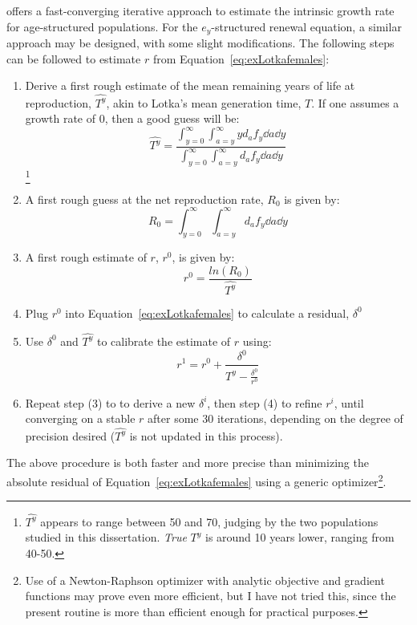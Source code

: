  \FloatBarrier
\label{sec:exrenewalit}
\citet{coale1957new} offers a fast-converging iterative approach to estimate the
intrinsic growth rate for age-structured populations. For the $e_y$-structured
renewal equation, a similar approach may be designed, with some slight
modifications. The following steps can be followed to estimate $r$ from
Equation~\ref{eq:exLotkafemales}:

\begin{enumerate}
  \item Derive a first rough estimate of the mean remaining years of life at
  reproduction, $\widehat{T^y}$, akin to Lotka's mean generation time, $T$. If
  one assumes a growth rate of $0$, then a good guess will be:
\begin{equation}
\widehat{T^y} = \frac{\int _{y=0}^\infty \int _{a=y}^\infty y d_a f_y \dd a
\dd y}{\int _{y=0}^\infty \int _{a=y}^\infty d_a f_y \dd a \dd y}
\end{equation}
 \footnote{$\widehat{T^y}$ appears to range between 50 and 70, judging by the
 two populations studied in this dissertation. \textit{True} $T^y$ is around 10
 years lower, ranging from 40-50.}
  \item A first rough guess at the net reproduction rate, $R_0$ is given by:
 \begin{equation}
  R_0 = \int _{y=0}^\infty \int _{a=y}^\infty d_a f_y \dd a
\dd y
\end{equation}
  \item A first rough estimate of $r$, $r^0$, is given by:
   \begin{equation}
   r^0 = \frac{ln(R_0)}{\widehat{T^y}}
   \end{equation}
  \item Plug $r^0$ into Equation~\ref{eq:exLotkafemales} to calculate a
  residual, $\delta^0$
  \item Use $\delta^0$ and $\widehat{T^y}$ to calibrate the estimate of $r$
  using:
  \begin{equation}
  r^{1} = r^0 + \frac{\delta^0}{\widehat{T^y} - \frac{\delta^0}{r^0}}
  \end{equation}
  \item Repeat step (3) to to derive a new $\delta^i$, then step (4) to refine
  $r^i$, until converging on a stable $r$ after some 30 iterations,
  depending on the degree of precision desired ($\widehat{T^y}$ is not updated
  in this process).
\end{enumerate}

The above procedure is both faster and more precise than minimizing the absolute
residual of Equation~\ref{eq:exLotkafemales} using a generic
optimizer\footnote{Use of a Newton-Raphson optimizer with analytic objective
and gradient functions may prove even more efficient, but I have not tried
this, since the present routine is more than efficient enough for practical
purposes.}.

